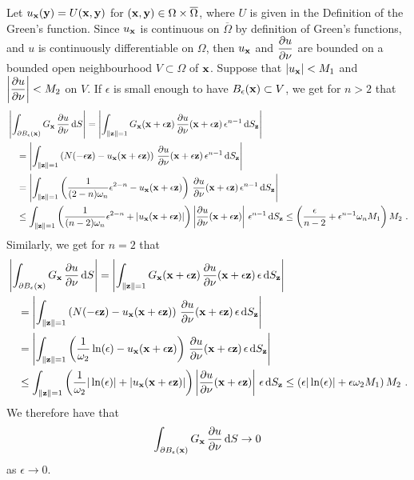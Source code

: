 Let $u_{\mathbf{x}}(\mathbf{y}) = U(\mathbf{x},\mathbf{y})$ for
$(\mathbf{x},\mathbf{y}) \in \Omega \times \overline{\Omega}$, where $U$ is
given in the Definition of the Green's function.
Since $u_{\mathbf{x}}$ is continuous on $\overline{\Omega}$ by definition
of Green's functions, and $u$ is continuously differentiable on
$\Omega$, then $u_{\mathbf{x}}$ and $\displaystyle \frac{\partial{u}}{\partial \mathbf{\nu}}$
are bounded on a bounded open neighbourhood $V \subset \Omega$ of
$\mathbf{x}$.  Suppose that $|u_{\mathbf{x}}| < M_1$ and
$\displaystyle \left| \frac{\partial{u}}{\partial \mathbf{\nu}} \right| < M_2$ on $V$.
If $\epsilon$ is small enough to have $B_\epsilon(\mathbf{x}) \subset V$,
we get for $n>2$ that
\begin{align*}
&\left|\int_{\partial B_{\epsilon}(\mathbf{x})}
G_{\mathbf{x}}\,\frac{\partial{u}}{\partial \mathbf{\nu}} \,\mathrm{d}{S}\right|
= \left| \int_{\|\mathbf{z}\|=1}
G_{\mathbf{x}}(\mathbf{x}+\epsilon \mathbf{z})
\,\frac{\partial{u}}{\partial \mathbf{\nu}}(\mathbf{x}+\epsilon \mathbf{z})
\, \epsilon^{n-1} \,\mathrm{d}{S}_{\mathbf{z}} \right| \\
&\quad = \left| \int_{\|\mathbf{z}\|=1}
\left( N(-\epsilon\mathbf{z}) - u_{\mathbf{x}}(\mathbf{x} + \epsilon \mathbf{z}) \right)
\,\frac{\partial{u}}{\partial \mathbf{\nu}}(\mathbf{x}+\epsilon \mathbf{z})
\,\epsilon^{n-1} \,\mathrm{d}{S}_{\mathbf{z}} \right| \\
&\quad = \left| \int_{\|\mathbf{z}\|=1}
\left( \frac{1}{(2-n)\omega_n} \epsilon^{2-n} -
u_{\mathbf{x}}(\mathbf{x} + \epsilon \mathbf{z})  \right)
\,\frac{\partial{u}}{\partial \mathbf{\nu}}(\mathbf{x} + \epsilon \mathbf{z})
\, \epsilon^{n-1} \,\mathrm{d}{S}_{\mathbf{z}} \right| \\
&\quad \leq \int_{\|\mathbf{z}\|=1}
\left( \frac{1}{(n-2)\omega_n} \epsilon^{2-n} +
\left| u_{\mathbf{x}}(\mathbf{x} + \epsilon \mathbf{z}) \right| \right)
\left| \frac{\partial{u}}{\partial \mathbf{\nu}}(\mathbf{x} + \epsilon \mathbf{z})
\right|\, \epsilon^{n-1} \,\mathrm{d}{S}_{\mathbf{z}} \leq \left(\frac{\epsilon}{n-2} +
\epsilon^{n-1} \omega_n M_1\right) M_2 \ . 
\end{align*}
Similarly, we get for $n=2$ that
\begin{align*}
&\left|\int_{\partial B_{\epsilon}(\mathbf{x})}
G_{\mathbf{x}}\,\frac{\partial{u}}{\partial \mathbf{\nu}} \,\mathrm{d}{S}\right|
=\left| \int_{\|\mathbf{z}\|=1}
G_{\mathbf{x}}(\mathbf{x}+\epsilon \mathbf{z})
\,\frac{\partial{u}}{\partial \mathbf{\nu}}(\mathbf{x}+\epsilon \mathbf{z})
\, \epsilon \,\mathrm{d}{S}_{\mathbf{z}} \right| \\
&\quad = \left| \int_{\|\mathbf{z}\|=1}
\left( N(-\epsilon\mathbf{z}) - u_{\mathbf{x}}(\mathbf{x} + \epsilon \mathbf{z}) \right)
\,\frac{\partial{u}}{\partial \mathbf{\nu}}(\mathbf{x}+\epsilon \mathbf{z})
\, \epsilon \,\mathrm{d}{S}_{\mathbf{z}} \right| \\
&\quad = \left| \int_{\|\mathbf{z}\|=1}
\left( \frac{1}{\omega_2} \ln(\epsilon) -
u_{\mathbf{x}}(\mathbf{x} + \epsilon \mathbf{z}) \right)
\,\frac{\partial{u}}{\partial \mathbf{\nu}}(\mathbf{x} + \epsilon \mathbf{z})
\, \epsilon \,\mathrm{d}{S}_{\mathbf{z}} \right| \\
&\quad \leq \int_{\|\mathbf{z}\|=1}
\left( \frac{1}{\omega_2} |\ln(\epsilon)|  +
\left| u_{\mathbf{x}}(\mathbf{x} + \epsilon \mathbf{z}) \right| \right)
\left| \frac{\partial{u}}{\partial \mathbf{\nu}}(\mathbf{x} + \epsilon \mathbf{z})
\right|\, \epsilon \,\mathrm{d}{S}_{\mathbf{z}}
\leq \left( \epsilon |\ln(\epsilon)| + \epsilon \omega_2 M_1 \right) M_2 \ . 
\end{align*}
We therefore have that
\[
\int_{\partial B_{\epsilon}(\mathbf{x})}
G_{\mathbf{x}}\,\frac{\partial{u}}{\partial \mathbf{\nu}} \,\mathrm{d}{S} \to 0
\]
as $\epsilon \to 0$.

